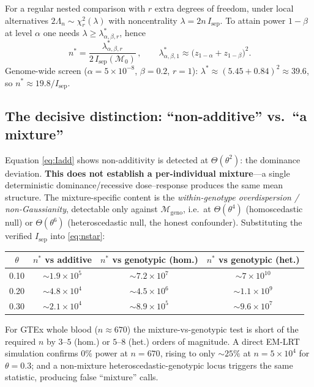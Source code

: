 \documentclass[11pt]{article}
\begin{document}
For a regular nested comparison with $r$ extra degrees of freedom, under local
alternatives $2\Lambda_n\sim\chi^2_r(\lambda)$ with noncentrality
$\lambda=2n\,I_{\mathrm{sep}}$. To attain power $1-\beta$ at level $\alpha$ one
needs $\lambda\ge\lambda^\ast_{\alpha,\beta,r}$, hence
\begin{equation}
\boxed{\,n^\ast=\dfrac{\lambda^\ast_{\alpha,\beta,r}}{2\,I_{\mathrm{sep}}(\mathcal M_0)}\,},
\qquad
\lambda^\ast_{\alpha,\beta,1}\approx\big(z_{1-\alpha}+z_{1-\beta}\big)^2 .
\label{eq:nstar}
\end{equation}
Genome-wide screen ($\alpha=5\times10^{-8}$, $\beta=0.2$, $r=1$):
$\lambda^\ast\approx(5.45+0.84)^2\approx39.6$, so $n^\ast\approx19.8/I_{\mathrm{sep}}$.

\subsection{The decisive distinction: ``non-additive'' vs.\ ``a mixture''}
Equation \eqref{eq:Iadd} shows non-additivity is detected at $\Theta(\theta^2)$:
the dominance deviation. \textbf{This does not establish a per-individual
mixture}---a single deterministic dominance/recessive dose--response produces the
same mean structure. The mixture-specific content is the
\emph{within-genotype overdispersion / non-Gaussianity}, detectable only against
$\mathcal M_{\mathrm{geno}}$, i.e.\ at $\Theta(\theta^4)$ (homoscedastic null) or
$\Theta(\theta^6)$ (heteroscedastic null, the honest confounder). Substituting
the verified $I_{\mathrm{sep}}$ into \eqref{eq:nstar}:
\begin{center}\small
\begin{tabular}{cccc}
\toprule
$\theta$ & $n^\ast$ vs additive & $n^\ast$ vs genotypic (hom.) & $n^\ast$ vs genotypic (het.)\\
\midrule
0.10 & $\sim1.9\times10^{5}$ & $\sim7.2\times10^{7}$ & $\sim7\times10^{10}$\\
0.20 & $\sim4.8\times10^{4}$ & $\sim4.5\times10^{6}$ & $\sim1.1\times10^{9}$\\
0.30 & $\sim2.1\times10^{4}$ & $\sim8.9\times10^{5}$ & $\sim9.6\times10^{7}$\\
\bottomrule
\end{tabular}
\end{center}
For GTEx whole blood ($n\approx670$) the mixture-vs-genotypic test is short of the
required $n$ by $3$--$5$ (hom.) or $5$--$8$ (het.) orders of magnitude. A direct
EM-LRT simulation confirms $0\%$ power at $n=670$, rising to only $\sim25\%$ at
$n=5\times10^4$ for $\theta=0.3$; and a non-mixture heteroscedastic-genotypic
locus triggers the same statistic, producing false ``mixture'' calls.
\end{document}
